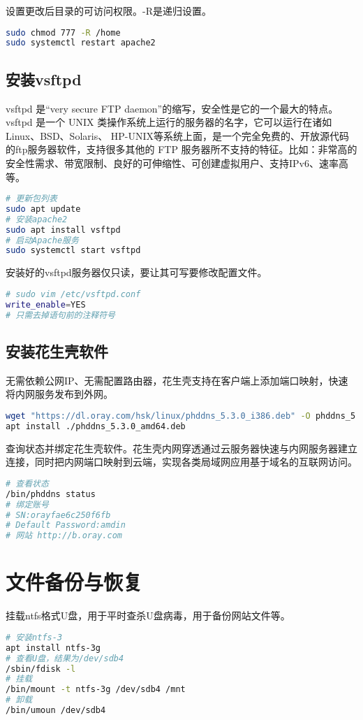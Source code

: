 \documentclass[UTF8,a4paper,12pt]{ctexbook} %
\begin{document}
设置更改后目录的可访问权限。-R是递归设置。
\begin{lstlisting}[language={bash}]
sudo chmod 777 -R /home
sudo systemctl restart apache2
\end{lstlisting}
\subsection{安装vsftpd}
vsftpd 是“very secure FTP daemon”的缩写，安全性是它的一个最大的特点。vsftpd 是一个 UNIX 类操作系统上运行的服务器的名字，它可以运行在诸如 Linux、BSD、Solaris、 HP-UNIX等系统上面，是一个完全免费的、开放源代码的ftp服务器软件，支持很多其他的 FTP 服务器所不支持的特征。比如：非常高的安全性需求、带宽限制、良好的可伸缩性、可创建虚拟用户、支持IPv6、速率高等。
\begin{lstlisting}[language={bash}]
# 更新包列表
sudo apt update
# 安装apache2
sudo apt install vsftpd
# 启动Apache服务
sudo systemctl start vsftpd
\end{lstlisting}


安装好的vsftpd服务器仅只读，要让其可写要修改配置文件。
\begin{lstlisting}[language={bash}]
# sudo vim /etc/vsftpd.conf
write_enable=YES
# 只需去掉语句前的注释符号
\end{lstlisting}

\subsection{安装花生壳软件}
无需依赖公网IP、无需配置路由器，花生壳支持在客户端上添加端口映射，快速将内网服务发布到外网。
\begin{lstlisting}[language={bash}]
wget "https://dl.oray.com/hsk/linux/phddns_5.3.0_i386.deb" -O phddns_5.3.0_i386.deb
apt install ./phddns_5.3.0_amd64.deb
\end{lstlisting}


查询状态并绑定花生壳软件。花生壳内网穿透通过云服务器快速与内网服务器建立连接，同时把内网端口映射到云端，实现各类局域网应用基于域名的互联网访问。
\begin{lstlisting}[language={bash}]
# 查看状态
/bin/phddns status
# 绑定账号
# SN:orayfae6c250f6fb
# Default Password:amdin
# 网站 http://b.oray.com
\end{lstlisting}

\section{文件备份与恢复}
挂载ntfs格式U盘，用于平时查杀U盘病毒，用于备份网站文件等。
\begin{lstlisting}[language={bash}]
# 安装ntfs-3
apt install ntfs-3g
# 查看U盘，结果为/dev/sdb4
/sbin/fdisk -l
# 挂载
/bin/mount -t ntfs-3g /dev/sdb4 /mnt
# 卸载
/bin/umoun /dev/sdb4
\end{lstlisting}
\end{document}
